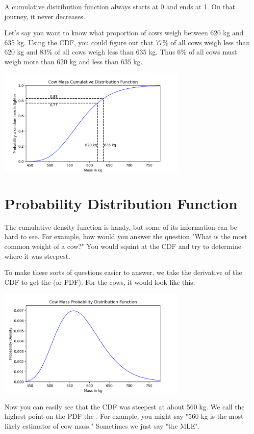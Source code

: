 A cumulative distribution function always starts at 0 and ends at 1.  On that journey, it never decreases.

Let's say you want to know what proportion of cows weigh between 620 kg and 635 kg.  Using the CDF, you could figure out that 77\% of all cows weigh less than 620 kg and 83\% of all cows 
weigh less than 635 kg.  Thus 6\% of all cows must weigh more than 620 kg and less than 635 kg.

\includegraphics[width=0.7\textwidth]{cow_cdf_bounds.png}

\section{Probability Distribution Function}

The cumulative density function is handy,  but some of its information can be hard to see.  For example,  how would you answer the question "What is the most common weight of a cow?"  You would
squint at the CDF and try to determine where it was steepest.

To make these sorts of questions easier to answer,  we take the derivative of the CDF to get the  (or PDF).  For the cows,  it would look like this:

\includegraphics[width=0.7\textwidth]{cow_pdf.png}

Now you can easily see that the CDF was steepest at about 560 kg.  We call the highest point on the PDF the .  For example, you might say "560 kg is the most likely estimator of cow mass."  Sometimes we just say "the MLE".

